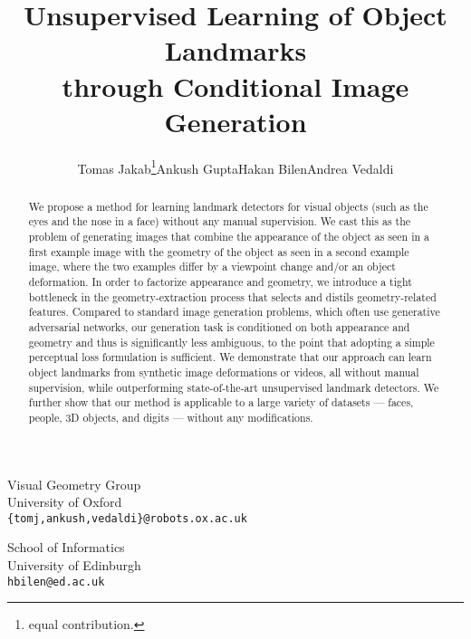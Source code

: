\documentclass{article}
\title{Unsupervised Learning of Object Landmarks\\ through Conditional Image Generation}
\author{Tomas Jakab\thanks{equal contribution.}\qquad Ankush Gupta\footnotemark[1]\qquad Hakan Bilen\qquad Andrea Vedaldi}
\begin{document}
\maketitle
{}
\vspace{-1.5em}
 \begin{minipage}{.49\linewidth}
 	\begin{center}
 		 Visual Geometry Group\\
 		University of Oxford\\
 		\texttt{\{tomj,ankush,vedaldi\}@robots.ox.ac.uk}  \\
 	\end{center}
 \end{minipage}
 \begin{minipage}{.49\linewidth}
 	\begin{center}
 		 School of Informatics\\
 		University of Edinburgh\\
 		\texttt{hbilen@ed.ac.uk}
 	\end{center}
 \end{minipage}
 \vspace{2em}

\begin{abstract}
We propose a method for learning landmark detectors for visual objects (such as the eyes and the nose in a face) without any manual supervision. We cast this as the problem of generating images that combine the appearance of the object as seen in a first example image with the geometry of the object as seen in a second example image, where the two examples differ by a viewpoint change and/or an object deformation. In order to factorize appearance and geometry, we introduce a tight bottleneck in the geometry-extraction process that selects and distils geometry-related features.
Compared to standard image generation problems, which often use generative adversarial networks, our generation task is conditioned on both appearance and geometry and thus is significantly less ambiguous, to the point that adopting a simple perceptual loss formulation is sufficient.
We demonstrate that our approach can learn object landmarks from synthetic image deformations or videos, all without manual supervision, while outperforming state-of-the-art unsupervised landmark detectors.
We further show that our method is applicable to a large variety of datasets --- faces, people, 3D objects, and digits --- without any modifications.
\end{abstract}
\end{document}
